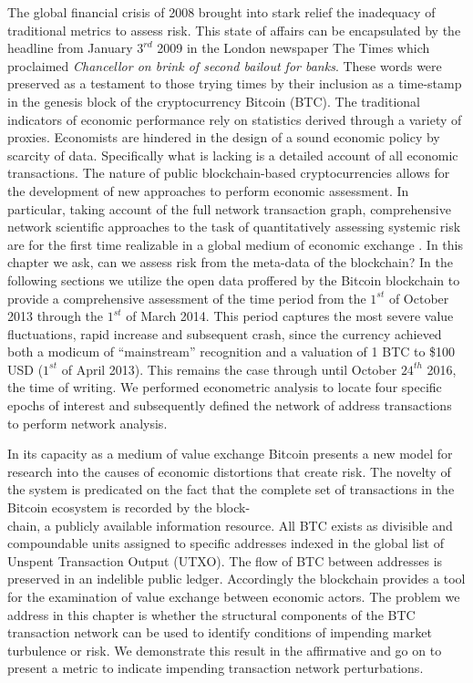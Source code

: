 The global financial crisis of 2008 brought into stark relief the inadequacy of traditional metrics to assess risk. 
This state of affairs can be encapsulated by the headline from January $3^{rd}$ 2009 in the London newspaper The Times which proclaimed \textit{Chancellor on brink of second bailout for banks}.
These words were preserved as a testament to those trying times by their inclusion as a time-stamp in the genesis block of the cryptocurrency Bitcoin (BTC). 
The traditional indicators of economic performance rely on statistics derived through a variety of proxies. 
Economists are hindered in the design of a sound economic policy by scarcity of data.
Specifically what is lacking is a detailed account of all economic transactions. 
The nature of public blockchain-based cryptocurrencies allows for the development of new approaches to perform economic assessment.
In particular, taking account of the full network transaction graph, comprehensive network scientific approaches to the task of quantitatively assessing systemic risk are for the first time realizable in a global medium of economic exchange \cite{battiston2012debtrank}. 
In this chapter we ask, can we assess risk from the meta-data of the blockchain?
In the following sections we utilize the open data proffered by the Bitcoin blockchain to provide a comprehensive assessment of the time period from the $1^{st}$ of October 2013 through the $1^{st}$ of March 2014. 
This period captures the most severe value fluctuations, rapid increase and subsequent crash, since the currency achieved both a modicum of ``mainstream'' recognition and a valuation of 1 BTC to \$100 USD ($1^{st}$ of April 2013). This remains the case through until October $24^{th}$ 2016, the time of writing.  We performed econometric analysis to locate four specific epochs of interest and subsequently defined the network of address transactions to perform network analysis.

In its capacity as a medium of value exchange Bitcoin presents a new model for research into the causes of economic distortions that create risk.
The novelty of the system is predicated on the fact that the complete set of transactions in the Bitcoin ecosystem is recorded by the block-\\
chain, a publicly available information resource.
All BTC exists as divisible and compoundable units assigned to specific addresses indexed in the global list of Unspent Transaction Output (UTXO). 
The flow of BTC between addresses is preserved in an indelible public ledger.
Accordingly the blockchain provides a tool for the examination of value exchange between economic actors.
The problem we address in this chapter is whether the structural components of the BTC transaction network can be used to identify conditions of impending market turbulence or risk.
We demonstrate this result in the affirmative and go on to present a metric to indicate impending transaction network perturbations. 

